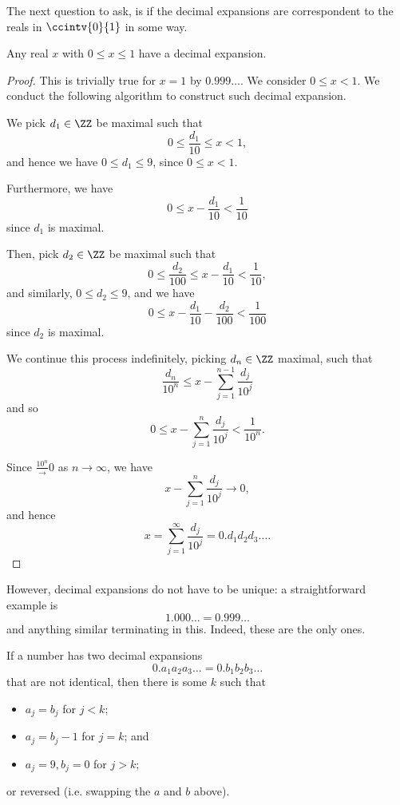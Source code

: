The next question to ask, is if the decimal expansions are correspondent to the reals in \(\ccintv{0}{1}\) in some way.

\begin{proposition}
    Any real \(x\) with \(0 \leq x \leq 1\) have a decimal expansion.
\end{proposition}

\begin{proof}
    This is trivially true for \(x = 1\) by \(0.999\ldots\). We consider \(0 \leq x < 1\). We conduct the following algorithm to construct such decimal expansion.

    We pick \(d_1 \in \ZZ\) be maximal such that
    \[
        0 \leq \frac{d_1}{10} \leq x < 1,
    \]
    and hence we have \(0 \leq d_1 \leq 9\), since \(0 \leq x < 1\).

    Furthermore, we have
    \[
        0 \leq x - \frac{d_1}{10} < \frac{1}{10}
    \]
    since \(d_1\) is maximal.

    Then, pick \(d_2 \in \ZZ\) be maximal such that
    \[
        0 \leq \frac{d_2}{100} \leq x - \frac{d_1}{10} < \frac{1}{10},
    \]
    and similarly, \(0 \leq d_2 \leq 9\), and we have
    \[
        0 \leq x - \frac{d_1}{10} - \frac{d_2}{100} < \frac{1}{100}
    \]
    since \(d_2\) is maximal.

    We continue this process indefinitely, picking \(d_n \in \ZZ\) maximal, such that
    \[
        \frac{d_n}{10^n} \leq x - \sum_{j = 1}^{n - 1} \frac{d_j}{10^j}
    \]
    and so
    \[
        0 \leq x - \sum_{j = 1}^{n} \frac{d_j}{10^j} < \frac{1}{10^n}.
    \]

    Since \(\frac{10^n} \to 0\) as \(n \to \infty\), we have
    \[
        x - \sum_{j = 1}^{n} \frac{d_j}{10^j} \to 0,
    \]
    and hence
    \[
        x = \sum_{j = 1}^{\infty} \frac{d_j}{10^j} = 0.d_1 d_2 d_3 \ldots.
    \]
\end{proof}

However, decimal expansions do not have to be unique: a straightforward example is
\[
    1.000\ldots = 0.999\ldots
\]
and anything similar terminating in this. Indeed, these are the only ones.

\begin{proposition}
    If a number has two decimal expansions
    \[
        0.a_1 a_2 a_3 \ldots = 0.b_1 b_2 b_3 \ldots
    \]
    that are not identical, then there is some \(k\) such that
    \begin{itemize}
        \item \(a_j = b_j\) for \(j < k\);
        \item \(a_j = b_j - 1\) for \(j = k\); and
        \item \(a_j = 9, b_j = 0\) for \(j > k\);
    \end{itemize}
    or reversed (i.e. swapping the \(a\) and \(b\) above).
\end{proposition}

